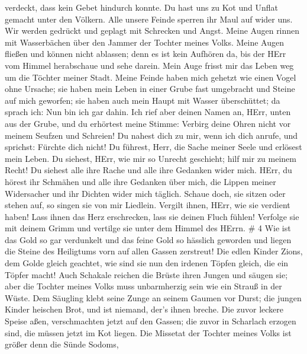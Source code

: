verdeckt, dass kein Gebet hindurch konnte.  Du hast uns zu
Kot und Unflat gemacht unter den Völkern.  Alle unsere
Feinde sperren ihr Maul auf wider uns.  Wir werden gedrückt
und geplagt mit Schrecken und Angst.  Meine Augen rinnen
mit Wasserbächen über den Jammer der Tochter meines Volks. 
Meine Augen fließen und können nicht ablassen; denn es ist kein Aufhören
da,  bis der HErr vom Himmel herabschaue und sehe darein.
 Mein Auge frisst mir das Leben weg um die Töchter meiner
Stadt.  Meine Feinde haben mich gehetzt wie einen Vogel
ohne Ursache;  sie haben mein Leben in einer Grube fast
umgebracht und Steine auf mich geworfen;  sie haben auch
mein Haupt mit Wasser überschüttet; da sprach ich: Nun bin ich gar
dahin.  Ich rief aber deinen Namen an, HErr, unten aus der
Grube,  und du erhörtest meine Stimme: Verbirg deine Ohren
nicht vor meinem Seufzen und Schreien!  Du nahest dich zu
mir, wenn ich dich anrufe, und sprichst: Fürchte dich nicht!
 Du führest, Herr, die Sache meiner Seele und erlösest mein
Leben.  Du siehest, HErr, wie mir so Unrecht geschieht;
hilf mir zu meinem Recht!  Du siehest alle ihre Rache und
alle ihre Gedanken wider mich.  HErr, du hörest ihr
Schmähen und alle ihre Gedanken über mich,  die Lippen
meiner Widersacher und ihr Dichten wider mich täglich. 
Schaue doch, sie sitzen oder stehen auf, so singen sie von mir Liedlein.
 Vergilt ihnen, HErr, wie sie verdient haben! 
Lass ihnen das Herz erschrecken, lass sie deinen Fluch fühlen!
 Verfolge sie mit deinem Grimm und vertilge sie unter dem
Himmel des HErrn. \# 4  Wie ist das Gold so gar verdunkelt
und das feine Gold so hässlich geworden und liegen die Steine des
Heiligtums vorn auf allen Gassen zerstreut!  Die edlen
Kinder Zions, dem Golde gleich geachtet, wie sind sie nun den irdenen
Töpfen gleich, die ein Töpfer macht!  Auch Schakale reichen
die Brüste ihren Jungen und säugen sie; aber die Tochter meines Volks
muss unbarmherzig sein wie ein Strauß in der Wüste.  Dem
Säugling klebt seine Zunge an seinem Gaumen vor Durst; die jungen Kinder
heischen Brot, und ist niemand, der's ihnen breche.  Die
zuvor leckere Speise aßen, verschmachten jetzt auf den Gassen; die zuvor
in Scharlach erzogen sind, die müssen jetzt im Kot liegen. 
Die Missetat der Tochter meines Volks ist größer denn die Sünde Sodoms,
